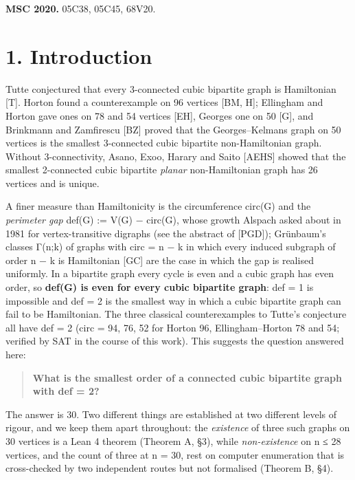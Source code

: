 \documentclass[11pt,a4paper]{article}
\theoremstyle{named}
\begin{document}
\textbf{MSC 2020.} 05C38, 05C45, 68V20.

\section*{1. Introduction}
Tutte conjectured that every 3-connected cubic bipartite graph is Hamiltonian [T]. Horton found a counterexample on 96 vertices [BM, H]; Ellingham and Horton gave ones on 78 and 54 vertices [EH], Georges one on 50 [G], and Brinkmann and Zamfirescu [BZ] proved that the Georges–Kelmans graph on 50 vertices is the smallest 3-connected cubic bipartite non-Hamiltonian graph. Without 3-connectivity, Asano, Exoo, Harary and Saito [AEHS] showed that the smallest 2-connected cubic bipartite \textit{planar} non-Hamiltonian graph has 26 vertices and is unique.

A finer measure than Hamiltonicity is the circumference circ(G) and the \textit{perimeter gap} def(G) := \textbar{}V(G)\textbar{} − circ(G), whose growth Alspach asked about in 1981 for vertex-transitive digraphs (see the abstract of [PGD]); Grünbaum's classes Γ(n;k) of graphs with circ = n − k in which every induced subgraph of order n − k is Hamiltonian [GC] are the case in which the gap is realised uniformly. In a bipartite graph every cycle is even and a cubic graph has even order, so \textbf{def(G) is even for every cubic bipartite graph}: def = 1 is impossible and def = 2 is the smallest way in which a cubic bipartite graph can fail to be Hamiltonian. The three classical counterexamples to Tutte's conjecture all have def = 2 (circ = 94, 76, 52 for Horton 96, Ellingham–Horton 78 and 54; verified by SAT in the course of this work). This suggests the question answered here:

\begin{quote}
\textbf{What is the smallest order of a connected cubic bipartite graph with def = 2?}
\end{quote}
The answer is 30. Two different things are established at two different levels of rigour, and we keep them apart throughout: the \textit{existence} of three such graphs on 30 vertices is a Lean 4 theorem (Theorem A, §3), while \textit{non-existence} on n ≤ 28 vertices, and the count of three at n = 30, rest on computer enumeration that is cross-checked by two independent routes but not formalised (Theorem B, §4).
\end{document}

